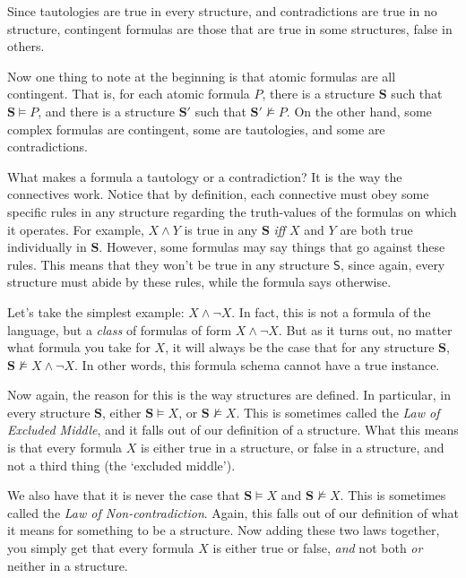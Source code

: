 \begin{remark}
Since tautologies are true in every structure, and contradictions are true in no structure, contingent formulas are those that are true in some structures, false in others. 
\end{remark}

Now one thing to note at the beginning is that atomic formulas are all contingent. That is, for each atomic formula $P$, there is a structure $\mathbf{S}$ such that $\mathbf{S} \models P$, and there is a structure $\mathbf{S}'$ such that $\mathbf{S}' \not\models P$. On the other hand, some complex formulas are contingent, some are tautologies, and some are contradictions. 

What makes a formula a tautology or a contradiction? It is the way the connectives work. Notice that by definition, each connective must obey some specific rules in any structure regarding the truth-values of the formulas on which it operates. For example, $X \wedge Y$ is true in any $\mathbf{S}$ \textit{iff} $X$ and $Y$ are both true individually in $\mathbf{S}$. However, some formulas may say things that go against these rules. This means that they won't be true in any structure $\mathsf{S}$, since again, every structure must abide by these rules, while the formula says otherwise. 

Let's take the simplest example: $X \wedge \neg X$. In fact, this is not a formula of the language, but a \textit{class} of formulas of form $X \wedge \neg X$. But as it turns out, no matter what formula you take for $X$, it will always be the case that for any structure $\mathbf{S}$, $\mathbf{S} \not\models X \wedge \neg X$. In other words, this formula schema cannot have a true instance. 

Now again, the reason for this is the way structures are defined. In particular, in every structure $\mathbf{S}$, either $\mathbf{S} \models X$, or $\mathbf{S} \not\models X$. This is sometimes called the \textit{Law of Excluded Middle}, and it falls out of our definition of a structure. What this means is that every formula $X$ is either true in a structure, or false in a structure, and not a third thing (the `excluded middle'). 

We also have that it is never the case that $\mathbf{S} \models X$ and $\mathbf{S} \not\models X$. This is sometimes called the \textit{Law of Non-contradiction}. Again, this falls out of our definition of what it means for something to be a structure. Now adding these two laws together, you simply get that every formula $X$ is either true or false, \textit{and} not both \textit{or} neither in a structure.

